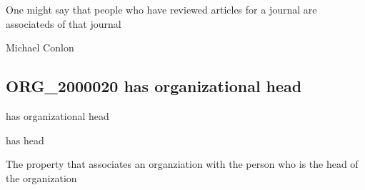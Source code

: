 \documentclass[letterpaper,10pt,english]{sphinxmanual}
\begin{document}
\begin{sphinxShadowBox}

\sphinxAtStartPar
One might say that people who have reviewed articles for a journal are associateds of that journal
\end{sphinxShadowBox}

\begin{sphinxShadowBox}

\sphinxAtStartPar
Michael Conlon 
\end{sphinxShadowBox}
\begin{quote}

\ignorespaces \end{quote}


\subsection{ORG\_2000020 \sphinxhyphen{} has organizational head}
\label{\detokenize{doc-ORG_2000020:org-2000020-has-organizational-head}}\label{\detokenize{doc-ORG_2000020:index-0}}\label{\detokenize{doc-ORG_2000020::doc}}
\begin{sphinxShadowBox}

\sphinxAtStartPar
has organizational head
\end{sphinxShadowBox}

\begin{sphinxShadowBox}

\sphinxAtStartPar
has head
\end{sphinxShadowBox}

\begin{sphinxShadowBox}

\sphinxAtStartPar
{}
\end{sphinxShadowBox}

\begin{sphinxShadowBox}

\sphinxAtStartPar
The property that associates an organziation with the person who is the head of the organization
\end{sphinxShadowBox}
\end{document}
